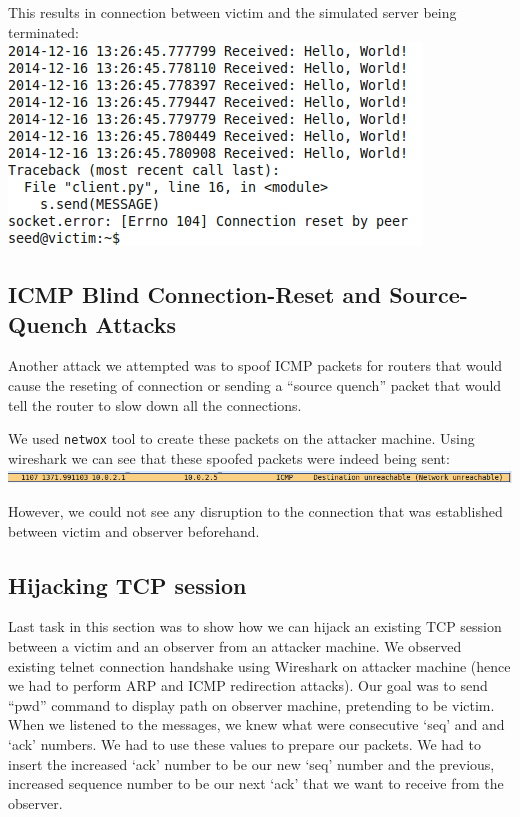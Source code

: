 \documentclass[12pt, a4paper, pdflatex]{article}
\begin{document}
This results in connection between victim and the simulated server being terminated:\\
\includegraphics[width=.95\textwidth]{gfx/python.png}

\subsection{ICMP Blind Connection-Reset and Source-Quench Attacks}

Another attack we attempted was to spoof ICMP packets for routers that would cause the reseting of connection or sending a ``source quench'' packet that would tell the router to slow down all the connections.

We used \texttt{netwox} tool to create these packets on the attacker machine.
Using wireshark we can see that these spoofed packets were indeed being sent:\\

\includegraphics[width=.95\textwidth]{gfx/unrechable.png}

However, we could not see any disruption to the connection that was established between victim and observer beforehand.


\subsection{Hijacking TCP session}

Last task in this section was to show how we can hijack an existing TCP session
between a victim and an observer from an attacker machine. We observed existing telnet
connection handshake using Wireshark on attacker machine (hence we had to perform ARP and ICMP redirection attacks).
Our goal was to send ``pwd'' command to display path on observer machine, pretending to be victim. When we listened to the
messages, we knew what were consecutive `seq' and and `ack' numbers. We had to use these values to prepare our packets. We had to insert
the increased `ack' number to be our new `seq' number and the previous, increased sequence number to be our next `ack' that we want to receive from the observer.\\
\end{document}
